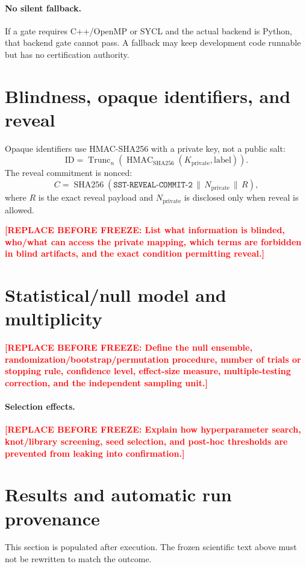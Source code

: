 \documentclass[11pt,a4paper]{article}
\newcommand{\SSTTODO}[1]{\ifmmode\text{\color{red}\bfseries TODO}\else\textcolor{red}{\textbf{[REPLACE BEFORE FREEZE: #1]}}\fi}
\begin{document}
\paragraph{No silent fallback.}
If a gate requires C++/OpenMP or SYCL and the actual backend is Python, that backend gate cannot pass. A fallback may keep development code runnable but has no certification authority.

\section{Blindness, opaque identifiers, and reveal}
Opaque identifiers use HMAC-SHA256 with a private key, not a public salt:
\begin{equation}
\mathrm{ID}=\operatorname{Trunc}_n\!\left(\operatorname{HMAC}_{\mathrm{SHA256}}(K_{\mathrm{private}},\mathrm{label})\right).
\end{equation}
The reveal commitment is nonced:
\begin{equation}
C=\operatorname{SHA256}(\texttt{SST-REVEAL-COMMIT-2}\,\|\,N_{\mathrm{private}}\,\|\,R),
\end{equation}
where $R$ is the exact reveal payload and $N_{\mathrm{private}}$ is disclosed only when reveal is allowed.

\SSTTODO{List what information is blinded, who/what can access the private mapping, which terms are forbidden in blind artifacts, and the exact condition permitting reveal.}

\section{Statistical/null model and multiplicity}
\SSTTODO{Define the null ensemble, randomization/bootstrap/permutation procedure, number of trials or stopping rule, confidence level, effect-size measure, multiple-testing correction, and the independent sampling unit.}

\paragraph{Selection effects.}
\SSTTODO{Explain how hyperparameter search, knot/library screening, seed selection, and post-hoc thresholds are prevented from leaking into confirmation.}

\section{Results and automatic run provenance}
This section is populated after execution. The frozen scientific text above must not be rewritten to match the outcome.
\end{document}
